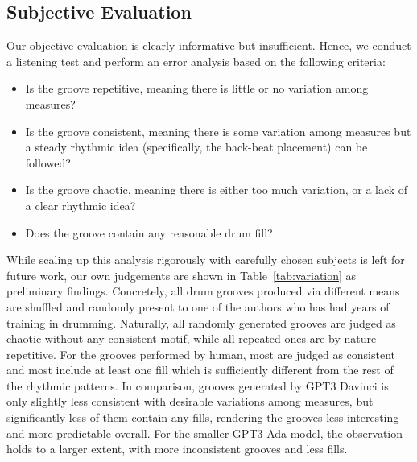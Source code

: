 \documentclass[letterpaper]{article} %
\begin{document}
\subsection{Subjective Evaluation}
Our objective evaluation is clearly informative but insufficient. Hence, we conduct a listening test and perform an error analysis based on the following criteria:
\begin{itemize}
\item Is the groove repetitive, meaning there is little or no variation among measures?
\item Is the groove consistent, meaning there is some variation among measures but a steady rhythmic idea (specifically, the back-beat placement) can be followed?
\item Is the groove chaotic, meaning there is either too much variation, or a lack of a clear rhythmic idea?
\item Does the groove contain any reasonable drum fill?
\end{itemize}

While scaling up this analysis rigorously with carefully chosen subjects is left for future work, our own judgements are shown in Table~\ref{tab:variation} as preliminary findings. Concretely, all drum grooves produced via different means are shuffled and randomly present to one of the authors who has had years of training in drumming. Naturally, all randomly generated grooves are judged as chaotic without any consistent motif, while all repeated ones are by nature repetitive. For the grooves performed by human, most are judged as consistent and most include at least one fill which is sufficiently different from the rest of the rhythmic patterns. In comparison, grooves generated by GPT3 Davinci is only slightly less consistent with desirable variations among measures, but significantly less of them contain any fills, rendering the grooves less interesting and more predictable overall. For the smaller GPT3 Ada model, the observation holds to a larger extent, with more inconsistent grooves and less fills.
\end{document}
